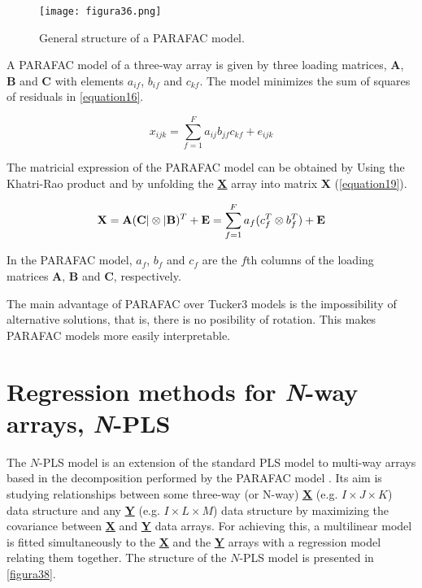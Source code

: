 \begin{figure}[hbtp]
\centering
\texttt{[image: figura36.png]}
\caption{General structure of a PARAFAC model.}
\label{figura36}
\end{figure}

A PARAFAC model of a three-way array is given by three loading matrices, \textbf{A}, \textbf{B} and \textbf{C} with elements $a_{if}$, $b_{if}$ and $c_{kf}$. The model minimizes the sum of squares of residuals in \autoref{equation16}.

\begin{equation}
x_{ijk}=\sum\limits_{f=1}^F a_{ij}b_{jf}c_{kf}+e_{ijk}
\label{equation16}
\end{equation}

The matricial expression of the PARAFAC model can be obtained by Using the Khatri-Rao product \parencite{liu2008hadamard} and by unfolding the \textbf{\underline{X}} array into matrix \textbf{X} (\autoref{equation19}).

\begin{equation}
\textbf{\text{X}}=\textbf{\text{A}}(\textbf{\text{C}}|\otimes|\textbf{\text{B}})^T + \textbf{\text{E}} = \sum\limits_{f=1}^F a_f(c^T_f\otimes b^T_f)+\textbf{\text{E}}
\label{equation19}
\end{equation}

In the PARAFAC model, $a_f$, $b_f$ and $c_f$ are the $f$th columns of the loading matrices \textbf{A}, \textbf{B} and \textbf{C}, respectively.

The main advantage of PARAFAC over Tucker3 models is the impossibility of alternative solutions, that is, there is no posibility of rotation. This makes PARAFAC models more easily interpretable.

\section{Regression methods for \textit{N}-way arrays, \textit{N}-PLS}
\label{NPLSregression}
The $N$-PLS model is an extension of the standard PLS model to multi-way arrays based in the decomposition performed by the PARAFAC model \parencite{bro1996multiway}. Its aim is studying relationships between some three-way (or N-way) \textbf{\underline{X}} (e.g. $I \times J \times K$) data structure and any \textbf{\underline{Y}} (e.g. $I \times L \times M$) data structure by maximizing the covariance between \textbf{\underline{X}} and \textbf{\underline{Y}} data arrays. For achieving this, a multilinear model is fitted simultaneously to the \textbf{\underline{X}} and the \textbf{\underline{Y}} arrays with a regression model relating them together. The structure of the $N$-PLS model is presented in \autoref{figura38}.

